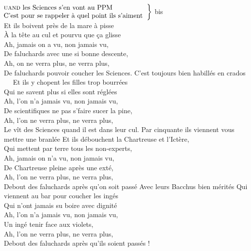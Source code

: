 
\\ 
$\left.\begin{tabular}{l}
\hspace{-0.4cm}
\textsc{uand} les Sciences s'en vont au PPM   
\\
\hspace{-0.4cm}
C'est pour se rappeler à quel point ils s'aiment         
\end{tabular}\right\rbrace$ bis
\\Et ils boivent près de la mare à pisse	
\\À la tête au cul et pourvu que ça glisse	
\\Ah, jamais on a vu, non jamais vu,	
\\De faluchards avec une si bonne descente,	
\\Ah, on ne verra plus, ne verra plus,	
\\De faluchards pouvoir coucher les Sciences.	
{C'est toujours bien habillés en crados    ~~}
Et ils y chopent les filles trop bourrées	
\\Qui ne savent plus si elles sont réglées	
\\Ah, l'on n'a jamais vu, non jamais vu,
\\De scientifiques ne pas s'faire sucer la pine,	
\\Ah, l'on ne verra plus, ne verra plus,	
\\Le vît des Sciences quand il est dans leur cul.
{Par cinquante ils viennent vous mettre une branlée}
Et ils débouchent la Chartreuse et l'Ictère,	
\\Qui mettent par terre tous les non-experts,	
\\Ah, jamais on n'a vu, non jamais vu,	
\\De Chartreuse pleine après une exté,	
\\Ah, l'on ne verra plus, ne verra plus,	
\\Debout des faluchards après qu'on soit passé
{Avec leurs Bacchus bien mérités}
Qui viennent au bar pour coucher les ingés	
\\Qui n'ont jamais su boire avec dignité	
\\Ah, l'on n'a jamais vu, non jamais vu,	
\\Un ingé tenir face aux violets,	
\\Ah, l'on ne verra plus, ne verra plus,	
\\Debout des faluchards après qu'ils soient passés !

\breakpage